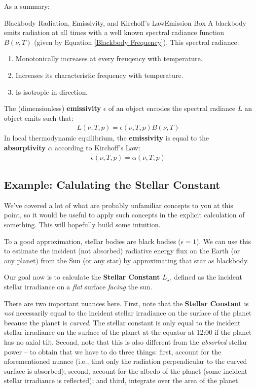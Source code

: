 As a summary:
\begin{fact}{Blackbody Radiation, Emissivity, and Kirchoff's Law}{Emission Box}\label{Emission Box}
    A blackbody emits radiation at all times with a well known spectral radiance function $B(\nu,T)$ (given by Equation \ref{Blackbody Frequency}). This spectral radiance:
    \begin{enumerate}
        \item Monotonically increases at every freuqency with temperature.
        \item Increases its characteristic frequency with temperature.
        \item Is isotropic in direction.
    \end{enumerate}

    The (dimensionless) \textbf{emissivity} $\epsilon$ of an object encodes the spectral radiance $L$ an object emits such that:
    \begin{gather}
        L(\nu,T,p)=\epsilon(\nu,T,p)B(\nu,T)
    \end{gather}
    In local thermodynamic equilibrium, the \textbf{emissivity} is equal to the \textbf{absorptivity} $\alpha$ according to Kirchoff's Law:
    \begin{align}
    \boxed{\epsilon(\nu,T,p)=\alpha(\nu,T,p)}
    \end{align}
\end{fact}

\subsection{Example: Calulating the Stellar Constant}\label{Example Stellar Const}

We've covered a lot of what are probably unfamiliar concepts to you at this point, so it would be useful to apply such concepts in the explicit calculation of something. This will hopefully build some intuition.

To a good approximation, stellar bodies are black bodies ($\epsilon=1$). We can use this to estimate the incident (not absorbed) radiative energy flux on the Earth (or any planet) from the Sun (or any star) by approximating that star as blackbody. 

Our goal now is to calculate the \textbf{Stellar Constant} $L_{\star}$, defined as the incident stellar irradiance on a \textit{flat} surface \textit{facing} the sun. 

There are two important nuances here. First, note that the \textbf{Stellar Constant} is \textit{not} necessarily equal to the incident stellar irradiance on the surface of the planet because the planet is \textit{curved}. The stellar constant is only equal to the incident stellar irradiance on the surface of the planet at the equator at 12:00 if the planet has no axial tilt. Second, note that this is also different from the \textit{absorbed} stellar power – to obtain that we have to do three things: first, account for the aforementioned nuance (i.e., that only the radiation perpendicular to the curved surface is absorbed); second, account for the albedo of the planet (some incident stellar irradiance is reflected); and third, integrate over the area of the planet.


